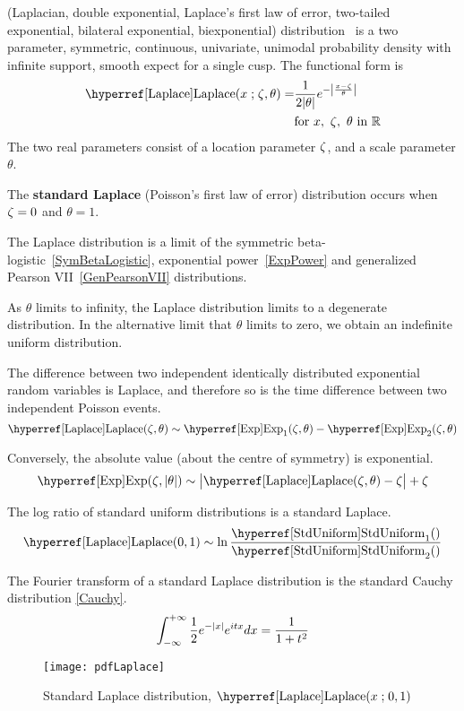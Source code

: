 

\label{sec:Laplace}
 (Laplacian, double exponential, Laplace's first law of error, two-tailed exponential, bilateral exponential, biexponential) distribution~\cite{Laplace1774,Stigler1986,Kotz2001}
 is  a two parameter, symmetric, continuous, univariate, unimodal probability density with infinite support, smooth expect for a single cusp.
The functional form is
\begin{align}
\label{Laplace}
\opr{Laplace}(x\given \pLoc, \theta) = & 
\frac{1}{2 |\theta|} e^{- \Left| \frac{x-\pLoc}{\theta}\Right|} 		\checked
\\
\notag
& \text{for } x,\ \pLoc,\  \theta \text{ in }  \mathbb{R}			\checked
\end{align}
The two real parameters consist of a location parameter $\zeta$,  and a scale parameter $\theta$.




The {\bf standard Laplace} (Poisson's first law of error) distribution occurs when $\zeta=0$ and $\theta=1$.




The Laplace distribution is a limit of the symmetric beta-logistic~\eqref{SymBetaLogistic}, exponential power~\eqref{ExpPower} and generalized Pearson VII~\eqref{GenPearsonVII} distributions.

As $\theta$ limits to infinity, the Laplace distribution limits to a degenerate distribution. In the alternative limit that $\theta$ limits to zero, we obtain an indefinite uniform distribution.


The difference between two independent identically distributed exponential random variables is Laplace, and therefore so is the time difference between two independent Poisson events.
\[
\opr{Laplace}(\pLoc, \theta) \sim  \opr{Exp}_1(\pLoc,\theta) - \opr{Exp}_2(\pLoc,\theta)
\checked
\notag
\]

Conversely, the absolute value (about the centre of symmetry) is exponential. 
\[
\opr{Exp}(\pLoc, |\theta|) \sim  \bigl|\opr{Laplace}(\pLoc,\theta) - \pLoc \bigr| +\pLoc
\checked
\notag
\]


The log ratio of standard uniform distributions is a standard Laplace.
\[
\opr{Laplace}(0,1) \sim \ln \frac{\opr{StdUniform}_1() }{\opr{StdUniform}_2()} \checked
\notag
\]


The Fourier transform of a standard Laplace distribution is the standard Cauchy distribution \eqref{Cauchy}.
\[
\int_{-\infty}^{+\infty} \frac{1}{2}e^{-| x |} e^{i t x} dx = \frac{1}{1+t^2}
\checked
\notag
\]



\begin{figure}[t!]
\begin{center}
\texttt{[image: pdfLaplace]}
\end{center}
\caption[Standard Laplace distribution]{Standard Laplace distribution, $\opr{Laplace}(x\given 0,1)$}
\end{figure}


